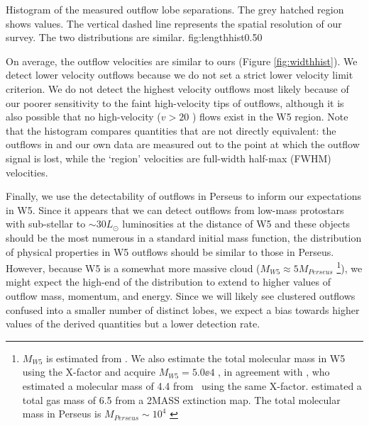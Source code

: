 {Histogram of the measured outflow lobe separations.  The grey hatched region shows
\citet{curtis2010} values.  The vertical dashed line represents the spatial
resolution of our survey.  The two distributions are similar.}
{fig:lengthhist}{0.5}{0}

On average, the \citet{curtis2010} outflow velocities are similar to ours
(Figure \ref{fig:widthhist}).   We detect lower velocity outflows because we do
not set a strict lower velocity limit criterion.  We do not detect the highest
velocity outflows most likely because of our poorer sensitivity to the faint
high-velocity tips of outflows, although it is also possible that no
high-velocity ($v>20$ \kms) flows exist in the W5 region.  Note that the
histogram compares quantities that are not directly equivalent: the outflows in
\citet{curtis2010} and our own data are measured out to the point at which the
outflow signal is lost, while the `region' velocities are full-width half-max
(FWHM) velocities.  

Finally, we use the detectability of outflows in Perseus to inform our
expectations in W5.  Since it appears that we can detect outflows from low-mass
protostars with sub-stellar to $\sim30L_\odot$ luminosities
at the distance of W5 and these objects should be the most numerous in a
standard initial mass function, the distribution of physical properties in W5
outflows should be similar to those in Perseus.  However, because W5 is a
somewhat more massive cloud ($M_{W5}\approx 5 M_{Perseus}$ \footnote{$M_{W5}$
is estimated from \thirteenco.  We also estimate the total molecular mass in W5 using
the X-factor and acquire $M_{W5}=5.0\ee{4}$ \msun, in agreement with
\citet{karr:triggered:2003}, who estimated a molecular mass of 4.4 from
\twelveco\ using the same X-factor.  \citet{koenig:clustered:2008} estimated a
total gas mass of 6.5 from a 2MASS extinction map.   The total molecular mass
in Perseus is $M_{Perseus} \sim 10^4$ \citep{bally-perseus2008}}), we might expect the
high-end of the distribution to extend to higher values of outflow mass,
momentum, and energy.  Since we will likely see clustered outflows confused
into a smaller number of distinct lobes, we expect a bias towards higher values
of the derived quantities but a lower detection rate.

